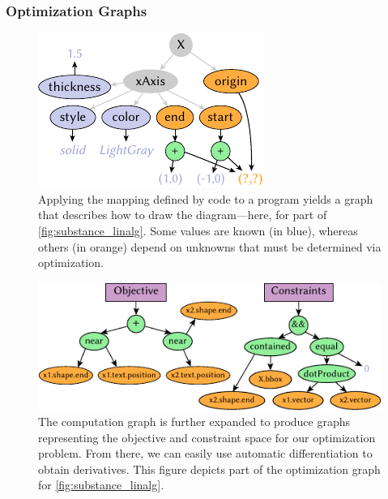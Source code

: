
\subsubsection{Optimization Graphs}
\label{sec:OptimizationGraphs}

\begin{figure}
   \begin{minipage}[c]{.4\linewidth}
      \vspace{-\baselineskip}\caption{Applying the mapping defined by \Style{} code to a \Substance{} program yields a graph that describes how to draw the diagram---here, for part of \cref{fig:substance_linalg}.  Some values are known (in blue), whereas others (in orange) depend on unknowns that must be determined via optimization.\label{fig:build_computation_graph}}
   \end{minipage}\hfill
   \begin{minipage}[c]{.5\linewidth}
   \includegraphics[scale=1.5]{assets/penrose/build_computation_graph.pdf}
   \end{minipage}
\end{figure}

\begin{figure}[t]
\centering
   \includegraphics[scale=1.5]{assets/penrose/optimization_computation_graph.pdf}
   \caption{The computation graph is further expanded to produce graphs representing the objective and constraint space for our optimization problem. From there, we can easily use automatic differentiation to obtain derivatives.  This figure depicts part of the optimization graph for \cref{fig:substance_linalg}.\label{fig:optimization_computation_graph}}
 \end{figure}

